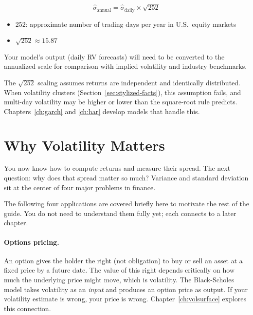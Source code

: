 \begin{equation}
  \hat{\sigma}_{\text{annual}} = \hat{\sigma}_{\text{daily}} \times \sqrt{252}
  \label{eq:annualize}
\end{equation}
\begin{itemize}[nosep]
  \item $252$: approximate number of trading days per year in U.S.\ equity markets
  \item $\sqrt{252} \approx 15.87$
\end{itemize}

\begin{projectconnection}
Your model's output (daily RV forecasts) will need to be converted to the annualized scale for comparison with implied volatility and industry benchmarks.
\end{projectconnection}

\begin{warning}
The $\sqrt{252}$ scaling assumes returns are independent and identically distributed.
When volatility clusters (Section~\ref{sec:stylized-facts}), this assumption fails, and multi-day volatility may be higher or lower than the square-root rule predicts.
Chapters~\ref{ch:garch} and \ref{ch:har} develop models that handle this.
\end{warning}

\section{Why Volatility Matters}
\label{sec:why-vol-matters}

You now know how to compute returns and measure their spread.
The next question: why does that spread matter so much?
Variance and standard deviation sit at the center of four major problems in finance.

\begin{prereq}
The following four applications are covered briefly here to motivate the rest of the guide.
You do not need to understand them fully yet; each connects to a later chapter.
\end{prereq}

\paragraph{Options pricing.}
An option gives the holder the right (not obligation) to buy or sell an asset at a fixed price by a future date.
The value of this right depends critically on how much the underlying price might move, which is volatility.
The Black-Scholes model \citep{Black1973} takes volatility as an \emph{input} and produces an option price as output.
If your volatility estimate is wrong, your price is wrong.
Chapter~\ref{ch:volsurface} explores this connection.

